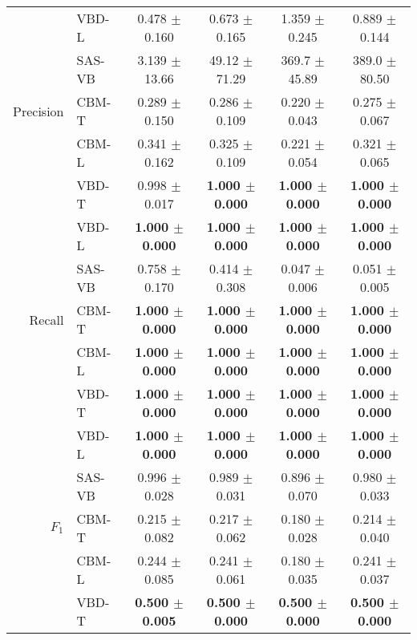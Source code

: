 \documentclass[11pt]{article}
\begin{document}
\begin{table}
{\begin{tabular}{r|l|cccc}
              & VBD-L & 0.478 $\pm$ 0.160          & 0.673 $\pm$ 0.165          & 1.359 $\pm$ 0.245          & 0.889 $\pm$ 0.144\\
              & SAS-VB  & 3.139 $\pm$ 13.66          & 49.12 $\pm$ 71.29          & 369.7 $\pm$ 45.89          & 389.0 $\pm$ 80.50\\
\hline
Precision     & CBM-T   & 0.289 $\pm$ 0.150          & 0.286 $\pm$ 0.109          & 0.220 $\pm$ 0.043          & 0.275 $\pm$ 0.067\\
              & CBM-L   & 0.341 $\pm$ 0.162          & 0.325 $\pm$ 0.109          & 0.221 $\pm$ 0.054          & 0.321 $\pm$ 0.065\\
              & VBD-T & 0.998 $\pm$ 0.017          & \textbf{1.000 $\pm$ 0.000} & \textbf{1.000 $\pm$ 0.000} & \textbf{1.000 $\pm$ 0.000}\\
              & VBD-L & \textbf{1.000 $\pm$ 0.000} & \textbf{1.000 $\pm$ 0.000} & \textbf{1.000 $\pm$ 0.000} & \textbf{1.000 $\pm$ 0.000}\\
              & SAS-VB  & 0.758 $\pm$ 0.170          & 0.414 $\pm$ 0.308          & 0.047 $\pm$ 0.006          & 0.051 $\pm$ 0.005\\
\hline
Recall        & CBM-T   & \textbf{1.000 $\pm$ 0.000} & \textbf{1.000 $\pm$ 0.000} & \textbf{1.000 $\pm$ 0.000} & \textbf{1.000 $\pm$ 0.000}\\
              & CBM-L   & \textbf{1.000 $\pm$ 0.000} & \textbf{1.000 $\pm$ 0.000} & \textbf{1.000 $\pm$ 0.000} & \textbf{1.000 $\pm$ 0.000}\\
              & VBD-T & \textbf{1.000 $\pm$ 0.000} & \textbf{1.000 $\pm$ 0.000} & \textbf{1.000 $\pm$ 0.000} & \textbf{1.000 $\pm$ 0.000}\\
              & VBD-L & \textbf{1.000 $\pm$ 0.000} & \textbf{1.000 $\pm$ 0.000} & \textbf{1.000 $\pm$ 0.000} & \textbf{1.000 $\pm$ 0.000}\\
              & SAS-VB  & 0.996 $\pm$ 0.028          & 0.989 $\pm$ 0.031          & 0.896 $\pm$ 0.070          & 0.980 $\pm$ 0.033\\
\hline
$F_1$         & CBM-T   & 0.215 $\pm$ 0.082          & 0.217 $\pm$ 0.062          & 0.180 $\pm$ 0.028          & 0.214 $\pm$ 0.040\\
              & CBM-L   & 0.244 $\pm$ 0.085          & 0.241 $\pm$ 0.061          & 0.180 $\pm$ 0.035          & 0.241 $\pm$ 0.037\\
              & VBD-T & \textbf{0.500 $\pm$ 0.005} & \textbf{0.500 $\pm$ 0.000} & \textbf{0.500 $\pm$ 0.000} & \textbf{0.500 $\pm$ 0.000}\\

\end{tabular}}
\end{table}
\end{document}
